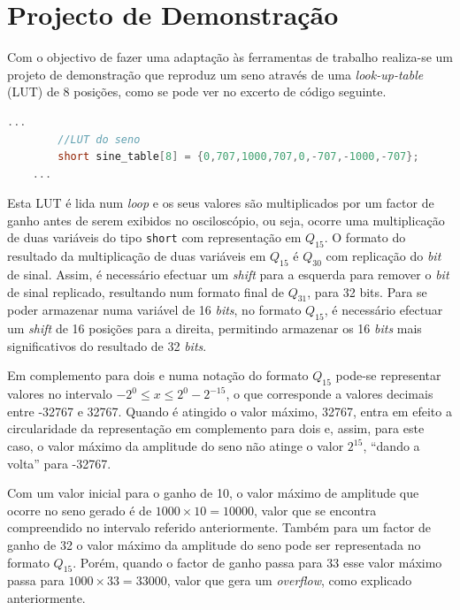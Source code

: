 \documentclass[11pt]{article}
\numberwithin{equation}{section}
\begin{document}
\pagebreak

\section{Projecto de Demonstração}

Com o objectivo de fazer uma adaptação às ferramentas de trabalho realiza-se um projeto de demonstração que reproduz um seno através de uma \textit{look-up-table} (LUT) de 8 posições, como se pode ver no excerto de código seguinte.

\begin{lstlisting}[language=C]
	...
		//LUT do seno
		short sine_table[8] = {0,707,1000,707,0,-707,-1000,-707}; 
	...
\end{lstlisting}

Esta LUT é lida num \textit{loop} e os seus valores são multiplicados por um factor de ganho antes de serem exibidos no osciloscópio, ou seja, ocorre uma multiplicação de duas variáveis do tipo \texttt{short} com representação em $Q_{15}$. O formato do resultado da multiplicação de duas variáveis em $Q_{15}$ é $Q_{30}$ com replicação do \textit{bit} de sinal. Assim, é necessário efectuar um \textit{shift} para a esquerda para remover o \textit{bit} de sinal replicado, resultando num formato final de $Q_{31}$, para 32 bits. Para se poder armazenar numa variável de 16 \textit{bits}, no formato $Q_{15}$, é necessário efectuar um \textit{shift} de 16 posições para a direita, permitindo armazenar os 16 \textit{bits} mais significativos do resultado de 32 \textit{bits}. 

Em complemento para dois e numa notação do formato $Q_{15}$ pode-se representar valores no intervalo $-2^{0} \leq x \leq 2^{0} - 2^{-15}$, o que corresponde a valores decimais entre -32767 e 32767. Quando é atingido o valor máximo, 32767, entra em efeito a circularidade da representação em complemento para dois e, assim, para este caso, o valor máximo da amplitude do seno não atinge o valor $2^{15}$, ``dando a volta'' para -32767. 

Com um valor inicial para o ganho de 10, o valor máximo de amplitude que ocorre no seno gerado é de $1000 \times 10 = 10000$, valor que se encontra compreendido no intervalo referido anteriormente. Também para um factor de ganho de 32 o valor máximo da amplitude do seno pode ser representada no formato $Q_{15}$. Porém, quando o factor de ganho passa para 33 esse valor máximo passa para $1000 \times 33 = 33000$, valor que gera um \textit{overflow}, como explicado anteriormente.
\end{document}
